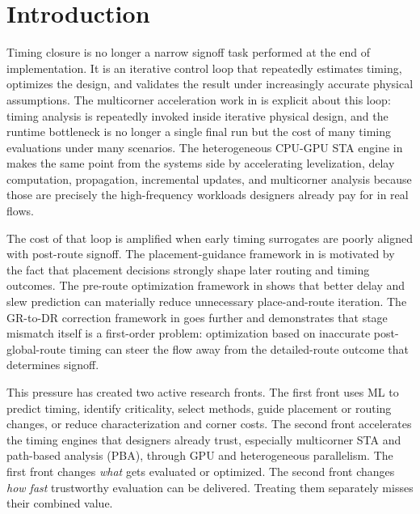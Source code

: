 \documentclass[num-refs]{wiley-article}
\begin{document}

  \section{Introduction}

  Timing closure is no longer a narrow signoff task performed at the end of implementation. It is an iterative control loop that repeatedly estimates timing, optimizes the design, and validates the result under increasingly accurate physical assumptions. The multicorner acceleration work in \cite{ref16} is explicit about this loop: timing analysis is repeatedly invoked inside iterative physical design, and the runtime bottleneck is no longer a single final run but the cost of many timing evaluations under many scenarios. The heterogeneous CPU-GPU STA engine in \cite{ref22} makes the same point from the systems side by accelerating levelization, delay computation, propagation, incremental updates, and multicorner analysis because those are precisely the high-frequency workloads designers already pay for in real flows.


  The cost of that loop is amplified when early timing surrogates are poorly aligned with post-route signoff. The placement-guidance framework in \cite{ref1} is motivated by the fact that placement decisions strongly shape later routing and timing outcomes. The pre-route optimization framework in \cite{ref17} shows that better delay and slew prediction can materially reduce unnecessary place-and-route iteration. The GR-to-DR correction framework in \cite{ref10} goes further and demonstrates that stage mismatch itself is a first-order problem: optimization based on inaccurate post-global-route timing can steer the flow away from the detailed-route outcome that determines signoff.


  This pressure has created two active research fronts. The first front uses ML to predict timing, identify criticality, select methods, guide placement or routing changes, or reduce characterization and corner costs. The second front accelerates the timing engines that designers already trust, especially multicorner STA and path-based analysis (PBA), through GPU and heterogeneous parallelism. The first front changes \emph{what} gets evaluated or optimized. The second front changes \emph{how fast} trustworthy evaluation can be delivered. Treating them separately misses their combined value.
\end{document}
